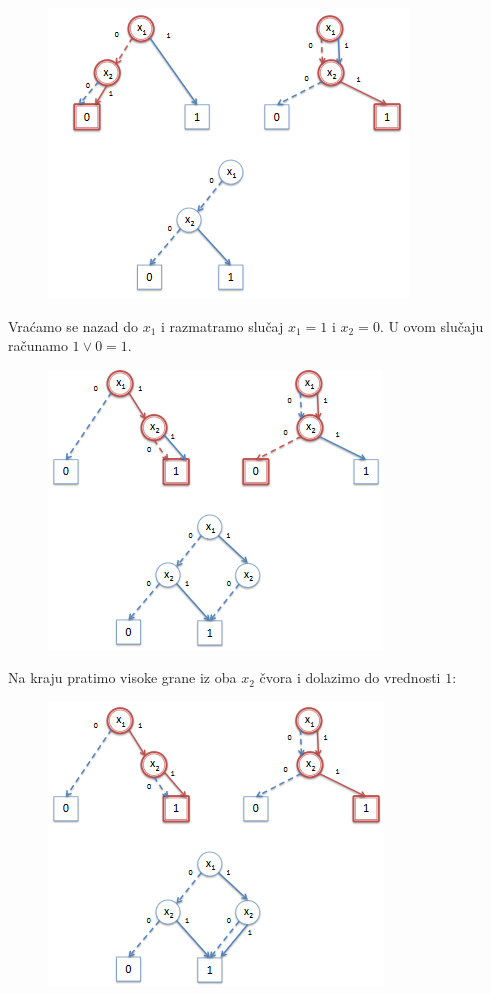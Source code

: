 \begin{exmp}
    \begin{figure}[H]
        \centering
        \includegraphics{slike/ROBDD_primer_5.PNG}
    \end{figure}

    Vra\'c{}amo se nazad do $x_{1}$ i razmatramo slu\v{c}aj $x_{1} = 1$ i $x_{2} = 0$. U ovom slu\v{c}aju ra\v{c}unamo $1 \vee 0 = 1$.

    \begin{figure}[H]
        \centering
        \includegraphics{slike/ROBDD_primer_6.PNG}
    \end{figure}

    Na kraju pratimo visoke grane iz oba $x_{2}$ \v{c}vora i dolazimo do vrednosti $1$:

    \begin{figure}[H]
        \centering
        \includegraphics{slike/ROBDD_primer_7.PNG}
    \end{figure}


\end{exmp}
